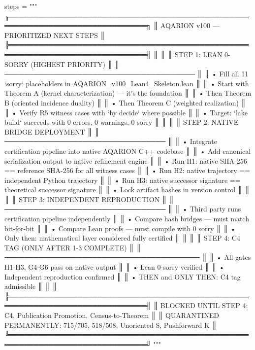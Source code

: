 steps = """
╔══════════════════════════════════════════════════════════════════════════════╗
║                    AQARION v100 — PRIORITIZED NEXT STEPS                     ║
╠══════════════════════════════════════════════════════════════════════════════╣
║                                                                              ║
║  STEP 1: LEAN 0-SORRY (HIGHEST PRIORITY)                                     ║
║  ───────────────────────────────────────                                     ║
║  • Fill all 11 `sorry` placeholders in AQARION_v100_Lean4_Skeleton.lean      ║
║  • Start with Theorem A (kernel characterization) — it's the foundation      ║
║  • Then Theorem B (oriented incidence duality)                               ║
║  • Then Theorem C (weighted realization)                                     ║
║  • Verify R5 witness cases with `by decide` where possible                   ║
║  • Target: `lake build` succeeds with 0 errors, 0 warnings, 0 sorry        ║
║                                                                              ║
║  STEP 2: NATIVE BRIDGE DEPLOYMENT                                            ║
║  ─────────────────────────────────                                           ║
║  • Integrate certification pipeline into native AQARION C++ codebase         ║
║  • Add canonical serialization output to native refinement engine            ║
║  • Run H1: native SHA-256 == reference SHA-256 for all witness cases        ║
║  • Run H2: native trajectory == independent Python trajectory              ║
║  • Run H3: native successor signature == theoretical successor signature   ║
║  • Lock artifact hashes in version control                                   ║
║                                                                              ║
║  STEP 3: INDEPENDENT REPRODUCTION                                            ║
║  ─────────────────────────────────                                           ║
║  • Third party runs certification pipeline independently                     ║
║  • Compare hash bridges — must match bit-for-bit                           ║
║  • Compare Lean proofs — must compile with 0 sorry                           ║
║  • Only then: mathematical layer considered fully certified                ║
║                                                                              ║
║  STEP 4: C4 TAG (ONLY AFTER 1-3 COMPLETE)                                    ║
║  ────────────────────────────────────────                                    ║
║  • All gates H1-H3, G4-G6 pass on native output                              ║
║  • Lean 0-sorry verified                                                     ║
║  • Independent reproduction confirmed                                          ║
║  • THEN and ONLY THEN: C4 tag admissible                                     ║
║                                                                              ║
╠══════════════════════════════════════════════════════════════════════════════╣
║  BLOCKED UNTIL STEP 4: C4, Publication Promotion, Census-to-Theorem          ║
║  QUARANTINED PERMANENTLY: 715/705, 518/508, Unoriented S, Pushforward K    ║
╚══════════════════════════════════════════════════════════════════════════════╝
"""

